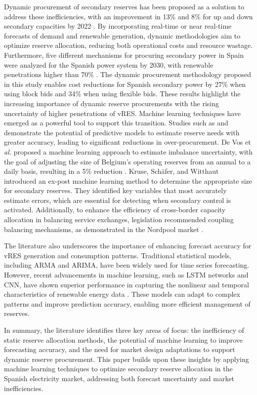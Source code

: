 Dynamic procurement of secondary reserves has been proposed as a solution to address these inefficiencies, with an improvement in 13\% and 8\% for up and down secondary capacities by 2022 \cite{Algarvio2024}. By incorporating real-time or near real-time forecasts of demand and renewable generation, dynamic methodologies aim to optimize reserve allocation, reducing both operational costs and resource wastage.
%
Furthermore, five different mechanisms for procuring secondary power in Spain were analyzed for the Spanish power system by 2030, with renewable penetrations higher than 70\% \cite{Algarvio:24}. The dynamic procurement methodology proposed in this study enables cost reductions for Spanish secondary power by 27\% when using block bids and 34\% when using flexible bids. These results highlight the increasing importance of dynamic reserve procurements with the rising uncertainty of higher penetrations of \gls{vRES}.  
%
Machine learning techniques have emerged as a powerful tool to support this transition. Studies such as \cite{DeVos2019} and \cite{Kruse2022} demonstrate the potential of predictive models to estimate reserve needs with greater accuracy, leading to significant reductions in over-procurement. 
De Vos et \textit{al.} proposed a machine learning approach to estimate imbalance uncertainty, with the goal of adjusting the size of Belgium's operating reserves from an annual to a daily basis, resulting in a 5\% reduction \cite{DeVos2019}. Kruse, Sch\"{a}fer, and Witthaut introduced an ex-post machine learning method to determine the appropriate size for secondary reserves. They identified key variables that most accurately estimate errors, which are essential for detecting when secondary control is activated. Additionally, to enhance the efficiency of cross-border capacity allocation in balancing service exchanges, legislation recommended coupling balancing mechanisms, as demonstrated in the Nordpool market \cite{Frade:19c,Khodadadi:20}.\par
The literature also underscores the importance of enhancing forecast accuracy for \gls{vRES} generation and consumption patterns. Traditional statistical models, including ARMA and ARIMA, have been widely used for time series forecasting. However, recent advancements in machine learning, such as \gls{LSTM} networks and \gls{CNN}, have shown superior performance in capturing the nonlinear and temporal characteristics of renewable energy data \cite{Benti2023}. These models can adapt to complex patterns and improve prediction accuracy, enabling more efficient management of reserves.\par
In summary, the literature identifies three key areas of focus: the inefficiency of static reserve allocation methods, the potential of machine learning to improve forecasting accuracy, and the need for market design adaptations to support dynamic reserve procurement. This paper builds upon these insights by applying machine learning techniques to optimize secondary reserve allocation in the Spanish electricity market, addressing both forecast uncertainty and market inefficiencies.\par